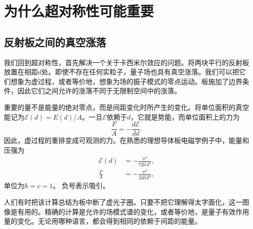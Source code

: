 \chapter{为什么超对称性可能重要}


\section{反射板之间的真空涨落}

我们回到超对称性，首先解决一个关于卡西米尔效应的问题。将两块平行的反射板放置在相距\(d\)处。即使不存在任何实粒子，量子场也具有真空涨落。我们可以把它们想象为虚过程，或者等价地，想象为场的振子模式的零点运动。板施加了边界条件，因此它们之间允许的涨落不同于无限制空间中的涨落。

重要的量不是能量的绝对零点，而是间距变化时所产生的变化。将单位面积的真空能记为\(\mathcal E(d)=E(d)/A\)。一旦\(\mathcal E\)依赖于\(d\)，它就是势能，而单位面积上的力为
\begin{equation}
\frac{F}{A}=-\frac{d\mathcal E}{dd}.
\end{equation}
因此，虚过程的重排变成可观测的力。在熟悉的理想导体板电磁学例子中，能量和压强为
\begin{align}
\mathcal E(d)&=-\frac{\pi^2}{720\,d^3},\\
\frac{F}{A}&=-\frac{\pi^2}{240\,d^4},
\end{align}
单位为\(\hbar=c=1\)。 负号表示吸引。

\begin{classroomqa}
\end{classroomqa}

人们有时把该计算总结为板中断了虚光子圈。只要不把它理解得太字面化，这一图像是有用的。精确的计算是允许的场模式谱的变化，或者等价地，是量子有效作用量的变化。无论用哪种语言，都会得到相同的依赖于间距的能量。

